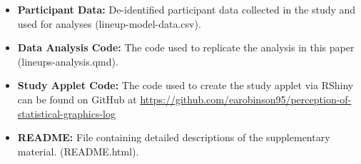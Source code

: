 \documentclass[12pt]{article}
\providecommand{\tightlist}{%
  \setlength{\itemsep}{0pt}\setlength{\parskip}{0pt}}
\begin{document}
\begin{itemize}
\tightlist
\item
  \textbf{Participant Data:} De-identified participant data collected in
  the study and used for analyses (lineup-model-data.csv).
\item
  \textbf{Data Analysis Code:} The code used to replicate the analysis
  in this paper (lineups-analysis.qmd).
\item
  \textbf{Study Applet Code:} The code used to create the study applet
  via RShiny can be found on GitHub at
  \url{https://github.com/earobinson95/perception-of-statistical-graphics-log}
\item
  \textbf{README:} File containing detailed descriptions of the
  supplementary material. (README.html).
\end{itemize}


\renewcommand\refname{Appendix}

\end{document}
